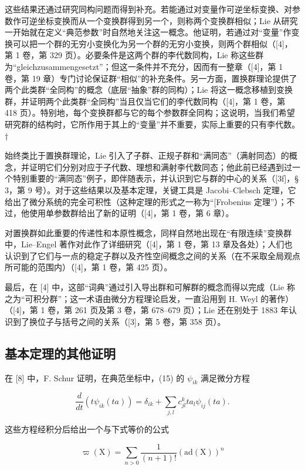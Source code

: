 这些结果还通过研究同构问题而得到补充。若能通过对变量作可逆坐标变换、对参数作可逆坐标变换而从一个变换群得到另一个，则称两个变换群相似；Lie 从研究一开始就在定义“典范参数”时自然地关注这一概念。他证明，若通过对“变量”作变换可以把一个群的无穷小变换化为另一个群的无穷小变换，则两个群相似（{[}4{]}，第 1 卷，第 329 页）。必要条件是这两个群的李代数同构，Lie 称这些群为“gleichzusammengesetzt”；但这一条件并不充分，因而有一整章（{[}4{]}，第 1 卷，第 19 章）专门讨论保证群“相似”的补充条件。另一方面，置换群理论提供了两个此类群“全同构”的概念（底层“抽象”群的同构）；Lie 将这一概念移植到变换群，并证明两个此类群“全同构”当且仅当它们的李代数同构（{[}4{]}，第 1 卷，第 418 页）。特别地，每个变换群都与它的每个参数群全同构；这说明，当我们希望研究群的结构时，它所作用于其上的“变量”并不重要，实际上重要的只有李代数。†

始终类比于置换群理论，Lie 引入了子群、正规子群和“满同态”（满射同态）的概念，并证明它们分别对应于子代数、理想和满射李代数同态；他此前已经遇到过一个特别重要的“满同态”例子，即伴随表示，并认识到它与群的中心的关系（{[}3f{]}，§ 3，第 9 号）。对于这些结果以及基本定理，关键工具是 Jacobi--Clebsch 定理，它给出了微分系统的完全可积性（这种定理的形式之一称为“{[}Frobenius 定理”）；不过，他使用单参数群给出了新的证明（{[}4{]}，第 1 卷，第 6 章）。

对置换群如此重要的传递性和本原性概念，同样自然地出现在“有限连续”变换群中，Lie--Engel 著作对此作了详细研究（{[}4{]}，第 1 卷，第 13 章及各处）；人们也认识到了它们与一点的稳定子群以及齐性空间概念之间的关系（在不采取全局观点所可能的范围内）（{[}4{]}，第 1 卷，第 425 页）。

最后，在 {[}4{]} 中，这部“词典”通过引入导出群和可解群的概念而得以完成（Lie 称之为“可积分群”；这一术语由微分方程理论启发，一直沿用到 H. Weyl 的著作）（{[}4{]}，第 1 卷，第 261 页及第 3 卷，第 678--679 页）；Lie 还在别处于 1883 年认识到了换位子与括号之间的关系（{[}3{]}，第 5 卷，第 358 页）。

\subsection*{基本定理的其他证明}

在 {[}8{]} 中，F. Schur 证明，在典范坐标中，(15) 的 \(\psi_{ik}\) 满足微分方程

\[
\frac {d}{d t} \left(t \psi_ {i k} (t a)\right) = \delta_ {i k} + \sum_ {j, l} c _ {j l} ^ {k} t a _ {l} \psi_ {i j} (t a).\tag{23}
\]

这些方程经积分后给出一个与下式等价的公式

\[
\varpi (\mathrm{X}) = \sum_ {n > 0} \frac {1}{(n + 1) !} (\mathrm{ad} (\mathrm{X})) ^ {n}\tag{24}
\]

